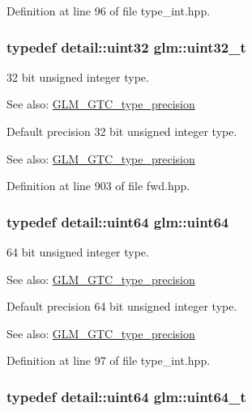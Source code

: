 Definition at line 96 of file type\_\-int.hpp.\hypertarget{group__gtc__type__precision_g822ca53a9ad412504532838906276a99}{
\subsubsection[uint32\_\-t]{\setlength{\rightskip}{0pt plus 5cm}typedef detail::uint32 {\bf glm::uint32\_\-t}}}
\label{group__gtc__type__precision_g822ca53a9ad412504532838906276a99}


32 bit unsigned integer type. \begin{Desc}
\item[See also:]\hyperlink{group__gtc__type__precision}{GLM\_\-GTC\_\-type\_\-precision}\end{Desc}
Default precision 32 bit unsigned integer type. \begin{Desc}
\item[See also:]\hyperlink{group__gtc__type__precision}{GLM\_\-GTC\_\-type\_\-precision} \end{Desc}


Definition at line 903 of file fwd.hpp.\hypertarget{group__gtc__type__precision_ge3632bf9b37da66233d78930dd06378a}{
\subsubsection[uint64]{\setlength{\rightskip}{0pt plus 5cm}typedef detail::uint64 {\bf glm::uint64}}}
\label{group__gtc__type__precision_ge3632bf9b37da66233d78930dd06378a}


64 bit unsigned integer type. \begin{Desc}
\item[See also:]\hyperlink{group__gtc__type__precision}{GLM\_\-GTC\_\-type\_\-precision}\end{Desc}
Default precision 64 bit unsigned integer type. \begin{Desc}
\item[See also:]\hyperlink{group__gtc__type__precision}{GLM\_\-GTC\_\-type\_\-precision} \end{Desc}


Definition at line 97 of file type\_\-int.hpp.\hypertarget{group__gtc__type__precision_g058f57c19e1befdcf12498944bd73e69}{
\subsubsection[uint64\_\-t]{\setlength{\rightskip}{0pt plus 5cm}typedef detail::uint64 {\bf glm::uint64\_\-t}}}
\label{group__gtc__type__precision_g058f57c19e1befdcf12498944bd73e69}


